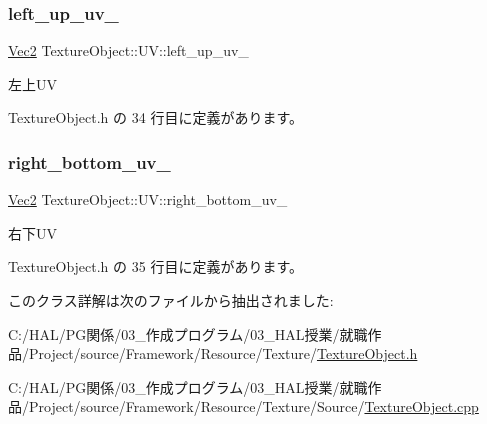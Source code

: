 \subsubsection{\texorpdfstring{left\+\_\+up\+\_\+uv\+\_\+}{left\_up\_uv\_}}
{\footnotesize\ttfamily \mbox{\hyperlink{_vector3_d_8h_a5ef6e95dfc5f9d3820b71772d99bbc25}{Vec2}} Texture\+Object\+::\+U\+V\+::left\+\_\+up\+\_\+uv\+\_\+\hspace{0.3cm}{\ttfamily [private]}}



左上\+UV 



 Texture\+Object.\+h の 34 行目に定義があります。

\mbox{\label{class_texture_object_1_1_u_v_a844cecfef539629da041254803f54795}} 
\subsubsection{\texorpdfstring{right\+\_\+bottom\+\_\+uv\+\_\+}{right\_bottom\_uv\_}}
{\footnotesize\ttfamily \mbox{\hyperlink{_vector3_d_8h_a5ef6e95dfc5f9d3820b71772d99bbc25}{Vec2}} Texture\+Object\+::\+U\+V\+::right\+\_\+bottom\+\_\+uv\+\_\+\hspace{0.3cm}{\ttfamily [private]}}



右下\+UV 



 Texture\+Object.\+h の 35 行目に定義があります。



このクラス詳解は次のファイルから抽出されました\+:\begin{DoxyCompactItemize}
\item 
C\+:/\+H\+A\+L/\+P\+G関係/03\+\_\+作成プログラム/03\+\_\+\+H\+A\+L授業/就職作品/\+Project/source/\+Framework/\+Resource/\+Texture/\mbox{\hyperlink{_texture_object_8h}{Texture\+Object.\+h}}\item 
C\+:/\+H\+A\+L/\+P\+G関係/03\+\_\+作成プログラム/03\+\_\+\+H\+A\+L授業/就職作品/\+Project/source/\+Framework/\+Resource/\+Texture/\+Source/\mbox{\hyperlink{_texture_object_8cpp}{Texture\+Object.\+cpp}}\end{DoxyCompactItemize}
